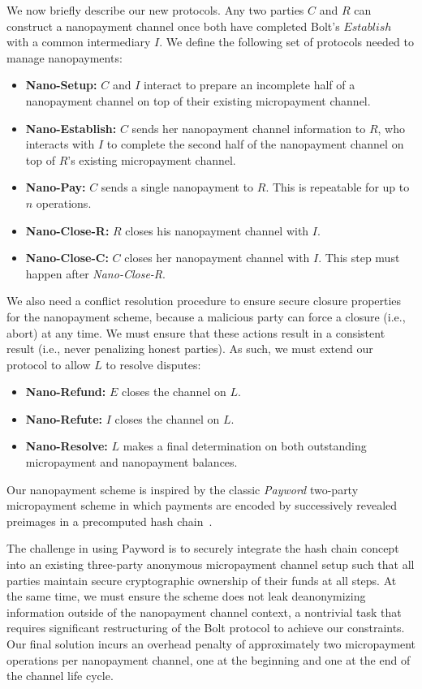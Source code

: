 We now briefly describe our new protocols.
Any two parties $C$ and $R$ can construct a nanopayment channel once both have completed Bolt's $Establish$ with a common intermediary $I$.
We define the following set of protocols needed to manage nanopayments:

\begin{itemize}[label={}]
\item \textbf{Nano-Setup:} $C$ and $I$ interact to prepare an incomplete half of a nanopayment channel on top of their existing micropayment channel.
\item \textbf{Nano-Establish:} $C$ sends her nanopayment channel information to $R$, who interacts with $I$ to complete the second half of the nanopayment channel on top of $R$'s existing micropayment channel.
\item \textbf{Nano-Pay:} $C$ sends a single nanopayment to $R$.
This is repeatable for up to $n$ operations.
\item \textbf{Nano-Close-R:} $R$ closes his nanopayment channel with $I$.
\item \textbf{Nano-Close-C:} $C$ closes her nanopayment channel with $I$.
This step must happen after \emph{Nano-Close-R}.
\end{itemize}

We also need a conflict resolution procedure to ensure secure closure properties for the nanopayment scheme, because a malicious party can force a closure (i.e., abort) at any time.
We must ensure that these actions result in a consistent result (i.e., never penalizing honest parties).
As such, we must extend our protocol to allow $L$ to resolve disputes:

\begin{itemize}[label={}]
\item \textbf{Nano-Refund:} $E$ closes the channel on $L$.
\item \textbf{Nano-Refute:} $I$ closes the channel on $L$.
\item \textbf{Nano-Resolve:} $L$ makes a final determination on both outstanding micropayment
  and nanopayment balances.
\end{itemize}

Our nanopayment scheme is inspired by the classic \emph{Payword} two-party micropayment scheme in which payments are encoded by successively revealed preimages in a precomputed hash chain~\cite{rivest1996payword}.

The challenge in using Payword is to securely integrate the hash chain concept into an existing three-party anonymous micropayment channel setup such that all parties maintain secure cryptographic ownership of their funds at all steps.
At the same time, we must ensure the scheme does not leak deanonymizing information outside of the nanopayment channel context, a nontrivial task that requires significant restructuring of the Bolt protocol to achieve our constraints.
Our final solution incurs an overhead penalty of approximately two micropayment operations per nanopayment channel, one at the beginning and one at the end of the channel life cycle.

